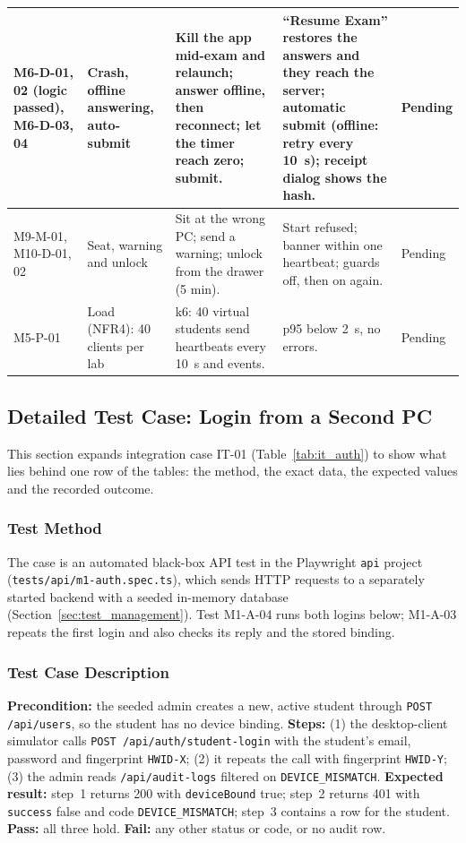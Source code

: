 {\begin{longtable}{@{}P{2.6cm}P{2.6cm}P{4.0cm}P{4.0cm}>{\centering\arraybackslash}p{1.4cm}@{}}
M6-D-01, 02 (logic passed), M6-D-03, 04 & Crash, offline answering, auto-submit & Kill the app mid-exam and relaunch; answer offline, then reconnect; let the timer reach zero; submit. & ``Resume Exam'' restores the answers and they reach the server; automatic submit (offline: retry every 10~s); receipt dialog shows the hash. & Pending\\ \hline
M9-M-01, M10-D-01, 02 & Seat, warning and unlock & Sit at the wrong PC; send a warning; unlock from the drawer (5 min). & Start refused; banner within one heartbeat; guards off, then on again. & Pending\\ \hline
M5-P-01 & Load (NFR4): 40 clients per lab & k6: 40 virtual students send heartbeats every 10~s and events. & p95 below 2~s, no errors. & Pending\\
\end{longtable}}

\subsection{Detailed Test Case: Login from a Second PC}\label{subsec:worked_case}
This section expands integration case IT-01 (Table~\ref{tab:it_auth}) to show what lies behind one row of the tables: the method, the exact data, the expected values and the recorded outcome.

\subsubsection{Test Method}
The case is an automated black-box API test in the Playwright \texttt{api} project (\texttt{tests/\allowbreak{}api/\allowbreak{}m1-auth.spec.ts}), which sends HTTP requests to a separately started backend with a seeded in-memory database (Section~\ref{sec:test_management}). Test M1-A-04 runs both logins below; M1-A-03 repeats the first login and also checks its reply and the stored binding.

\subsubsection{Test Case Description}
\textbf{Precondition:} the seeded admin creates a new, active student through \texttt{POST /api/users}, so the student has no device binding. \textbf{Steps:} (1) the desktop-client simulator calls \texttt{POST /api/auth/student-login} with the student's email, password and fingerprint \texttt{HWID-X}; (2) it repeats the call with fingerprint \texttt{HWID-Y}; (3) the admin reads \texttt{/api/audit-logs} filtered on \texttt{DEVICE\_MISMATCH}. \textbf{Expected result:} step~1 returns 200 with \texttt{deviceBound} true; step~2 returns 401 with \texttt{success} false and code \texttt{DEVICE\_MISMATCH}; step~3 contains a row for the student. \textbf{Pass:} all three hold. \textbf{Fail:} any other status or code, or no audit row.

